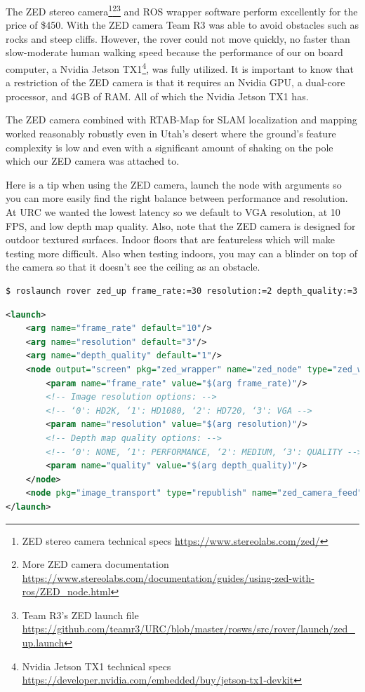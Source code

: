 \documentclass[runningheads,a4paper]{llncs}
\begin{document}
The ZED stereo camera\footnote{ZED stereo camera technical specs \url{https://www.stereolabs.com/zed/}}\footnote{More ZED camera documentation \url{https://www.stereolabs.com/documentation/guides/using-zed-with-ros/ZED_node.html}}\footnote{Team R3's ZED launch file \url{https://github.com/teamr3/URC/blob/master/rosws/src/rover/launch/zed_up.launch}} and ROS wrapper software perform excellently for the price of \$450. With the ZED camera Team R3 was able to avoid obstacles such as rocks and steep cliffs. However, the rover could not move quickly, no faster than slow-moderate human walking speed because the performance of our on board computer, a Nvidia Jetson TX1\footnote{Nvidia Jetson TX1 technical specs \url{https://developer.nvidia.com/embedded/buy/jetson-tx1-devkit}}, was fully utilized. It is important to know that a restriction of the ZED camera is that it requires an Nvidia GPU, a dual-core processor, and 4GB of RAM. All of which the Nvidia Jetson TX1 has. 

The ZED camera combined with RTAB-Map for SLAM localization and mapping worked reasonably robustly even in Utah's desert where the ground's feature complexity is low and even with a significant amount of shaking on the pole which our ZED camera was attached to.

Here is a tip when using the ZED camera, launch the node with arguments so you can more easily find the right balance between performance and resolution. At URC we wanted the lowest latency so we default to VGA resolution, at 10 FPS, and low depth map quality. Also, note that the ZED camera is designed for outdoor textured surfaces. Indoor floors that are featureless which will make testing more difficult. Also when testing indoors, you may can a blinder on top of the camera so that it doesn't see the ceiling as an obstacle. 

\begin{lstlisting}[frame=single,basicstyle=\ttfamily\footnotesize,breaklines=true,]
$ roslaunch rover zed_up frame_rate:=30 resolution:=2 depth_quality:=3
\end{lstlisting}

\begin{lstlisting}[language=XML,frame=single,basicstyle=\ttfamily\footnotesize,breaklines=true,captionpos=b,caption={}]
<launch>
    <arg name="frame_rate" default="10"/>
    <arg name="resolution" default="3"/>
    <arg name="depth_quality" default="1"/>
    <node output="screen" pkg="zed_wrapper" name="zed_node" type="zed_wrapper_node">
        <param name="frame_rate" value="$(arg frame_rate)"/>
        <!-- Image resolution options: -->
        <!-- ‘0': HD2K, ‘1': HD1080, ‘2': HD720, ‘3': VGA -->
        <param name="resolution" value="$(arg resolution)"/>
        <!-- Depth map quality options: -->
        <!-- ‘0': NONE, ‘1': PERFORMANCE, ‘2': MEDIUM, ‘3': QUALITY -->
        <param name="quality" value="$(arg depth_quality)"/>
    </node>
    <node pkg="image_transport" type="republish" name="zed_camera_feed" args="raw in:=rgb/image_rect_color out:=rgb_republished"/>
</launch>
\end{lstlisting}
\end{document}
